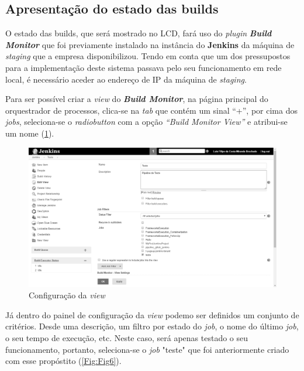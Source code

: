 \subsection{Apresentação do estado das builds}

\hspace{1cm}O estado das builds, que será mostrado no LCD, fará uso do \textit{plugin} \textbf{\textit{Build Monitor}} que foi previamente instalado na instância do \textbf{Jenkins} da máquina de \textit{staging} que a empresa disponibilizou. Tendo em conta que um dos pressupostos para a implementação deste sistema passava pelo seu funcionamento em rede local, é necessário aceder ao endereço de IP da máquina de \textit{staging}.

\hspace{1cm}Para ser possível criar a \textit{view} do \textbf{\textit{Build Monitor}}, na página principal do orquestrador de processos, clica-se na \textit{tab} que contém um sinal ``+'', por cima dos \textit{jobs}, seleciona-se o \textit{radiobutton} com a opção \textit{``Build Monitor View''} e atribui-se um nome (\ref{Fig:Fig5}).  

\begin{figure}
\centering
\includegraphics[width=0.9\linewidth]{Cap8/BuildMonitorConfig.png}
\caption{Configuração da \textit{view}}
\label{Fig:Fig5}
\end{figure}

\hspace{1cm}Já dentro do painel de configuração da \textit{view} podemo ser definidos um conjunto de critérios. Desde uma descrição, um filtro por estado do \textit{job}, o nome do último \textit{job}, o seu tempo de execução, etc. Neste caso, será apenas testado o seu funcionamento, portanto, seleciona-se o \textit{job} "teste" que foi anteriormente criado com esse propóstito (\ref{Fig:Fig6}).

